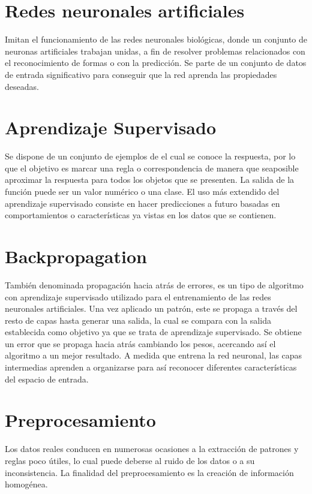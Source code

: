\section{Redes neuronales artificiales}
Imitan el funcionamiento de las redes neuronales biológicas, donde un conjunto de neuronas artificiales trabajan unidas, a fin de resolver problemas relacionados con el reconocimiento de formas o con la predicción. Se parte de un conjunto de datos de entrada significativo para conseguir que la red aprenda las propiedades deseadas.

\section{Aprendizaje Supervisado}
Se dispone de un conjunto de ejemplos de el cual se conoce la respuesta, por lo que el objetivo es marcar una regla o correspondencia de manera que seaposible aproximar la respuesta para todos los objetos que se presenten. La salida de la función puede ser un valor numérico o una clase.\cite{contributors_phpmyadmin_????}
El uso más extendido del aprendizaje supervisado consiste en hacer predicciones a futuro basadas en comportamientos o características ya vistas en los datos que se contienen.\cite{_machine_learning_2014}

\section{Backpropagation}
También denominada propagación hacia atrás de errores, es un tipo de algoritmo con aprendizaje supervisado utilizado para el entrenamiento de las redes neuronales artificiales. Una vez aplicado un patrón, este se propaga a través del resto de capas hasta generar una salida, la cual se compara con la salida establecida como objetivo ya que se trata de aprendizaje supervisado. Se obtiene un error que se propaga hacia atrás cambiando los pesos, acercando así el algoritmo a un mejor resultado.
A medida que entrena la red neuronal, las capas intermedias aprenden a organizarse para así reconocer diferentes características del espacio de entrada.\cite{mazur_step_2015}

\section{Preprocesamiento}
Los datos reales conducen en numerosas ocasiones a la extracción de patrones y reglas poco útiles, lo cual puede deberse al ruido de los datos o a su inconsistencia. La finalidad del preprocesamiento es la creación de información homogénea.

